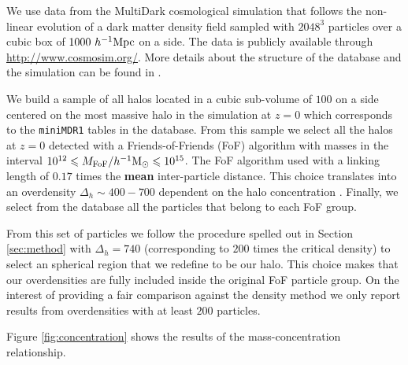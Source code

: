 \documentclass[a4,useAMS,usenatbib,usegraphicx]{mn2e}
\newcommand{\hMpc}{{\ifmmode{h^{-1}{\rm Mpc}}\else{$h^{-1}$Mpc}\fi}}
\newcommand{\hMsun}{{\ifmmode{h^{-1}{\rm {M_{\odot}}}}\else{$h^{-1}{\rm{M_{\odot}}}$}\fi}}
\begin{document}
We use data from the MultiDark cosmological simulation that follows
the non-linear evolution of a dark matter density field sampled with
$2048^3$ particles over a cubic box of $1000\ \hMpc$ on a side.  The
data is publicly available through \url{http://www.cosmosim.org/}.
More details about the structure of the database and the simulation
can be found in \citep{2013AN....334..691R}.

We build a sample of all halos located in a cubic sub-volume of $100$
\hMpc on a side centered on the most massive halo in the simulation at
$z=0$ which corresponds to the \texttt{miniMDR1} tables in the
database.  From this sample we select all the halos at $z=0$ detected
with a Friends-of-Friends (FoF) algorithm with masses in the interval
$10^{12}\leq M_{\rm FoF}/\hMsun \leq 10^{15}$.  The FoF algorithm used
with a linking length of $0.17$ times the {\bf mean} inter-particle
distance. This choice translates into an overdensity $\Delta_h\sim
400-700$ dependent on the halo concentration \citep{More2011}.
Finally, we select from the database all the particles that belong to
each FoF group.

From this set of particles we follow the procedure spelled out in
Section \ref{sec:method} with $\Delta_h=740$ (corresponding to $200$
times the critical density) to select an spherical region that we
redefine to be our halo.  This choice makes that our overdensities are
fully included inside the original FoF particle group.  On the
interest of providing a fair comparison against the density method we
only report results from overdensities with at least $200$ particles.

Figure \ref{fig:concentration} shows the results of the
mass-concentration relationship.



\end{document}
